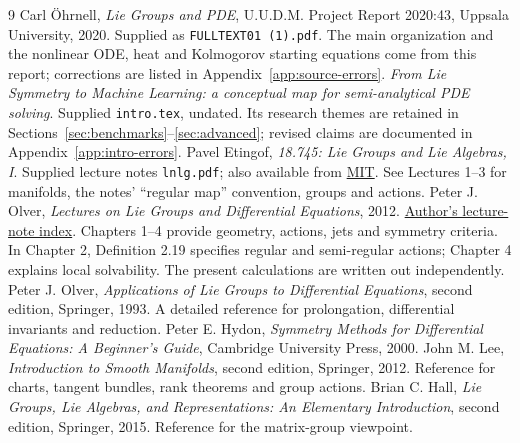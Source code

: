 \documentclass[11pt,a4paper]{article}
\numberwithin{equation}{section}
\theoremstyle{definition}
\theoremstyle{plain}
\theoremstyle{remark}
\begin{document}
\clearpage
{}
\begin{thebibliography}{9}
 Carl \"Ohrnell, \emph{Lie Groups and PDE}, U.U.D.M. Project Report 2020:43, Uppsala University, 2020. Supplied as \texttt{FULLTEXT01 (1).pdf}. The main organization and the nonlinear ODE, heat and Kolmogorov starting equations come from this report; corrections are listed in Appendix~\ref{app:source-errors}.
 \emph{From Lie Symmetry to Machine Learning: a conceptual map for semi-analytical PDE solving}. Supplied \texttt{intro.tex}, undated. Its research themes are retained in Sections~\ref{sec:benchmarks}--\ref{sec:advanced}; revised claims are documented in Appendix~\ref{app:intro-errors}.
 Pavel Etingof, \emph{18.745: Lie Groups and Lie Algebras, I}. Supplied lecture notes \texttt{lnlg.pdf}; also available from \href{https://math.mit.edu/~etingof/lnlg.pdf}{MIT}. See Lectures 1--3 for manifolds, the notes' ``regular map'' convention, groups and actions.
 Peter J. Olver, \emph{Lectures on Lie Groups and Differential Equations}, 2012. \href{https://www-users.cse.umn.edu/~olver/sm.html}{Author's lecture-note index}. Chapters 1--4 provide geometry, actions, jets and symmetry criteria. In Chapter 2, Definition 2.19 specifies regular and semi-regular actions; Chapter 4 explains local solvability. The present calculations are written out independently.
 Peter J. Olver, \emph{Applications of Lie Groups to Differential Equations}, second edition, Springer, 1993. A detailed reference for prolongation, differential invariants and reduction.
 Peter E. Hydon, \emph{Symmetry Methods for Differential Equations: A Beginner's Guide}, Cambridge University Press, 2000.
 John M. Lee, \emph{Introduction to Smooth Manifolds}, second edition, Springer, 2012. Reference for charts, tangent bundles, rank theorems and group actions.
 Brian C. Hall, \emph{Lie Groups, Lie Algebras, and Representations: An Elementary Introduction}, second edition, Springer, 2015. Reference for the matrix-group viewpoint.
\end{thebibliography}
\end{document}
